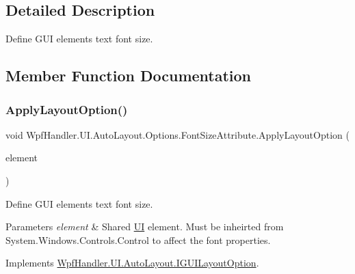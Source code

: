 \subsection{Detailed Description}
Define G\+UI element\textquotesingle{}s text font size. 



\subsection{Member Function Documentation}
\mbox{\label{class_wpf_handler_1_1_u_i_1_1_auto_layout_1_1_options_1_1_font_size_attribute_abd93e70e5419e81c4dfdd9b5d1f35343}} 
\subsubsection{\texorpdfstring{Apply\+Layout\+Option()}{ApplyLayoutOption()}}
{\footnotesize\ttfamily void Wpf\+Handler.\+U\+I.\+Auto\+Layout.\+Options.\+Font\+Size\+Attribute.\+Apply\+Layout\+Option (\begin{DoxyParamCaption}\item[{Framework\+Element}]{element }\end{DoxyParamCaption})}



Define G\+UI element\textquotesingle{}s text font size. 


\begin{DoxyParams}{Parameters}
{\em element} & Shared \mbox{\hyperlink{namespace_wpf_handler_1_1_u_i}{UI}} element. Must be inheirted from {\ttfamily System.\+Windows.\+Controls.\+Control} to affect the font properties. \\
\hline
\end{DoxyParams}


Implements \mbox{\hyperlink{interface_wpf_handler_1_1_u_i_1_1_auto_layout_1_1_i_g_u_i_layout_option_ac2d2fa8aeaf753b3248381399f991005}{Wpf\+Handler.\+U\+I.\+Auto\+Layout.\+I\+G\+U\+I\+Layout\+Option}}.



